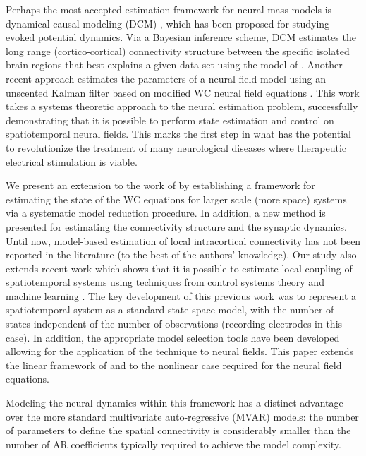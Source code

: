 \documentclass[review,authoryear,3p]{elsarticle}
\begin{document}
Perhaps the most accepted estimation framework for neural mass models is dynamical causal modeling (DCM) \citep{David2003,David2006}, which has been proposed for studying evoked potential dynamics. Via a Bayesian inference scheme, DCM estimates the long range (cortico-cortical) connectivity structure between the specific isolated brain regions that best explains a given data set using the model of \citet{Jansen1995}. Another recent approach estimates the parameters of a neural field model using an unscented Kalman filter based on modified WC neural field equations \citep{schiff2008kalman}. This work takes a systems theoretic approach to the neural estimation problem, successfully demonstrating that it is possible to perform state estimation and control on spatiotemporal neural fields. This marks the first step in what has the potential to revolutionize the treatment of many neurological diseases where therapeutic electrical stimulation is viable.

We present an extension to the work of \citet{schiff2008kalman} by establishing a framework for estimating the state of the WC equations for larger scale (more space) systems via a systematic model reduction procedure. In addition, a new method is presented for estimating the connectivity structure and the synaptic dynamics. Until now, model-based estimation of local intracortical connectivity has not been reported in the literature (to the best of the authors' knowledge). Our study also extends recent work which shows that it is possible to estimate local coupling of spatiotemporal systems using techniques from control systems theory and machine learning \citep{Dewar2009}. The key development of this previous work was to represent a spatiotemporal system as a standard state-space model, with the number of states independent of the number of observations (recording electrodes in this case). In addition, the appropriate model selection tools have been developed \citep{Scerri2009} allowing for the application of the technique to neural fields. This paper extends the linear framework of \citet{Dewar2009} and \citet{Scerri2009} to the nonlinear case required for the neural field equations. 

Modeling the neural dynamics within this framework has a distinct advantage over the more standard multivariate auto-regressive (MVAR) models: the number of parameters to define the spatial connectivity is considerably smaller than the number of AR coefficients typically required to achieve the model complexity. 
\end{document}
